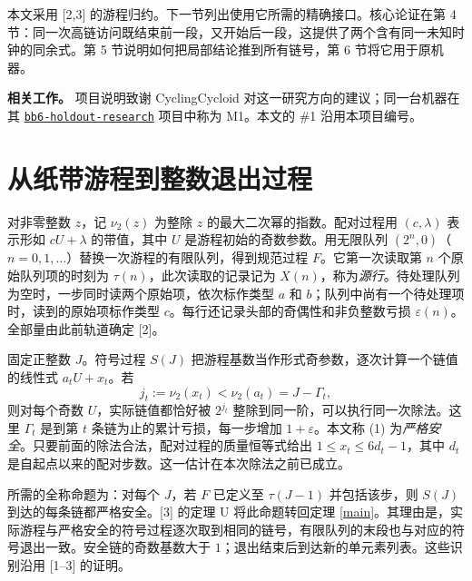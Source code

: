 \documentclass[UTF8,12pt,a4paper,fontset=fandol,scheme=plain]{ctexart}
\theoremstyle{cn}\newtheorem{thm}{定理}\newtheorem{lem}[thm]{引理}
\newcommand{\vv}{\nu_2}\newcommand{\lgx}{\log_2}
\begin{document}
本文采用 [2,3] 的游程归约。下一节列出使用它所需的精确接口。核心论证在第 4 节：同一次高链访问既结束前一段，又开始后一段，这提供了两个含有同一未知时钟的同余式。第 5 节说明如何把局部结论推到所有链号，第 6 节将它用于原机器。

\smallskip\noindent\textbf{相关工作。} 项目说明致谢 CyclingCycloid 对这一研究方向的建议；同一台机器在其 \href{https://github.com/CyclingCycloid/bb6-holdout-research}{\texttt{bb6-holdout-research}} 项目中称为 M1。本文的 \#1 沿用本项目编号。

\newpage
\section{从纸带游程到整数退出过程}
对非零整数 \(z\)，记 \(\vv(z)\) 为整除 \(z\) 的最大二次幂的指数。配对过程用 \((c,\lambda)\) 表示形如 \(cU+\lambda\) 的带值，其中 \(U\) 是游程初始的奇数参数。用无限队列 \((2^n,0)\)（\(n=0,1,\ldots\)）替换一次游程的有限队列，得到规范过程 \(F\)。它第一次读取第 \(n\) 个原始队列项的时刻为 \(\tau(n)\)，此次读取的记录记为 \(X(n)\)，称为\emph{源行}。待处理队列为空时，一步同时读两个原始项，依次标作类型 \(a\) 和 \(b\)；队列中尚有一个待处理项时，读到的原始项标作类型 \(c\)。每行还记录头部的奇偶性和非负整数亏损 \(\varepsilon(n)\)。全部量由此前轨道确定 [2]。

固定正整数 \(J\)。符号过程 \(S(J)\) 把游程基数当作形式奇参数，逐次计算一个链值的线性式 \(a_t U+x_t\)。若
\begin{equation}
             j_t:=\vv(x_t)<\vv(a_t)=J-\Gamma_t,                    \label{safety}
\end{equation}
则对每个奇数 \(U\)，实际链值都恰好被 \(2^{j_t}\) 整除到同一阶，可以执行同一次除法。这里 \(\Gamma_t\) 是到第 \(t\) 条链为止的累计亏损，每一步增加 \(1+\varepsilon\)。本文称 (1) 为\emph{严格安全}。只要前面的除法合法，配对过程的质量恒等式给出 \(1\le x_t\le6d_t-1\)，其中 \(d_t\) 是自起点以来的配对步数。这一估计在本次除法之前已成立。

所需的全称命题为：对每个 \(J\)，若 \(F\) 已定义至 \(\tau(J-1)\) 并包括该步，则 \(S(J)\) 到达的每条链都严格安全。[3] 的定理 U 将此命题转回定理 \ref{main}。其理由是，实际游程与严格安全的符号过程逐次取到相同的链号，有限队列的末段也与对应的符号退出一致。安全链的奇数基数大于 \(1\)；退出结束后到达新的单元素列表。这些识别沿用 [1–3] 的证明。
\end{document}
